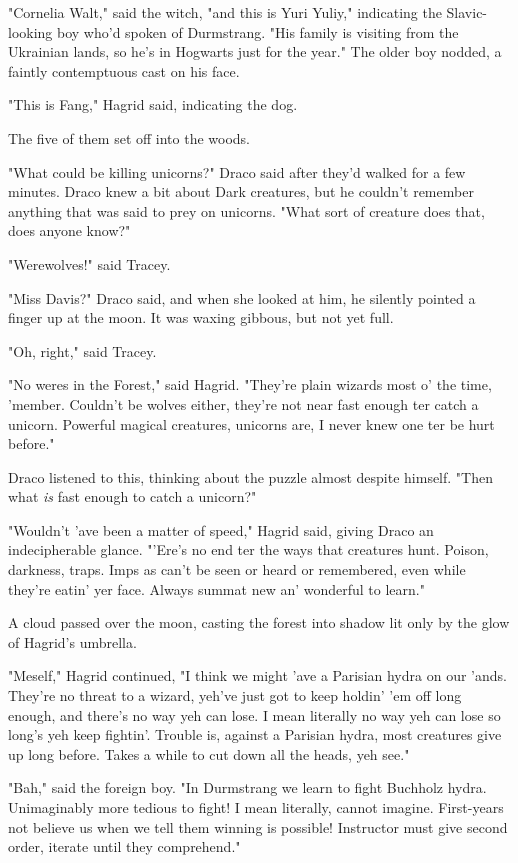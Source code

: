 "Cornelia Walt," said the witch, "and this is Yuri Yuliy," indicating the
Slavic-looking boy who'd spoken of Durmstrang. "His family is visiting from the
Ukrainian lands, so he's in Hogwarts just for the year." The older boy nodded,
a faintly contemptuous cast on his face.

"This is Fang," Hagrid said, indicating the dog.

The five of them set off into the woods.

"What could be killing unicorns?" Draco said after they'd walked for a few
minutes. Draco knew a bit about Dark creatures, but he couldn't remember
anything that was said to prey on unicorns. "What sort of creature does that,
does anyone know?"

"Werewolves!" said Tracey.

"Miss Davis?" Draco said, and when she looked at him, he silently pointed a
finger up at the moon. It was waxing gibbous, but not yet full.

"Oh, right," said Tracey.

"No weres in the Forest," said Hagrid. "They're plain wizards most o' the time,
'member. Couldn't be wolves either, they're not near fast enough ter catch a
unicorn. Powerful magical creatures, unicorns are, I never knew one ter be hurt
before."

Draco listened to this, thinking about the puzzle almost despite himself. "Then
what \emph{is} fast enough to catch a unicorn?"

"Wouldn't 'ave been a matter of speed," Hagrid said, giving Draco an
indecipherable glance. "'Ere's no end ter the ways that creatures hunt. Poison,
darkness, traps. Imps as can't be seen or heard or remembered, even while
they're eatin' yer face. Always summat new an' wonderful to learn."

A cloud passed over the moon, casting the forest into shadow lit only by the
glow of Hagrid's umbrella.

"Meself," Hagrid continued, "I think we might 'ave a Parisian hydra on our
'ands. They're no threat to a wizard, yeh've just got to keep holdin' 'em off
long enough, and there's no way yeh can lose. I mean literally no way yeh can
lose so long's yeh keep fightin'. Trouble is, against a Parisian hydra, most
creatures give up long before. Takes a while to cut down all the heads, yeh
see."

"Bah," said the foreign boy. "In Durmstrang we learn to fight Buchholz hydra.
Unimaginably more tedious to fight! I mean literally, cannot imagine.
First-years not believe us when we tell them winning is possible! Instructor
must give second order, iterate until they comprehend."

